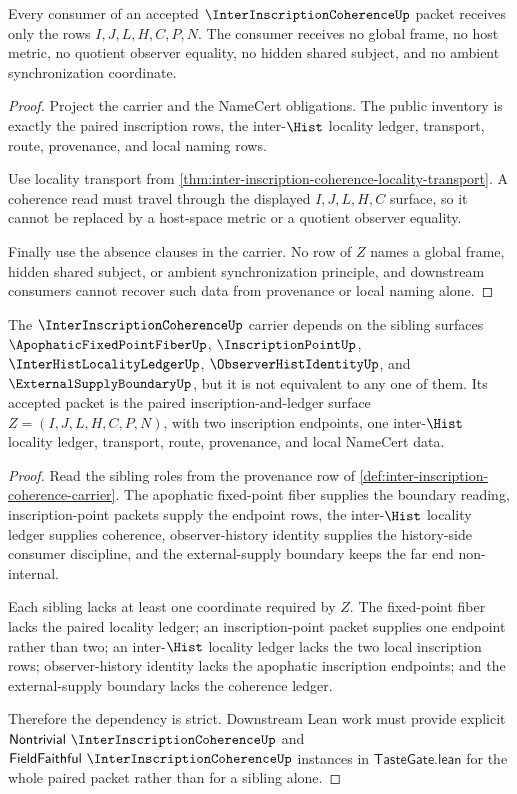 \begin{theorem}
\label{thm:inter-inscription-coherence-ledger-nonescape}
Every consumer of an accepted $\InterInscriptionCoherenceUp$ packet receives only the rows $I,J,L,H,C,P,N$. The consumer receives no global frame, no host metric, no quotient observer equality, no hidden shared subject, and no ambient synchronization coordinate.
\end{theorem}
\begin{proof}
Project the carrier and the NameCert obligations. The public inventory is exactly the paired inscription rows, the inter-$\Hist$ locality ledger, transport, route, provenance, and local naming rows.

Use locality transport from \autoref{thm:inter-inscription-coherence-locality-transport}. A coherence read must travel through the displayed $I,J,L,H,C$ surface, so it cannot be replaced by a host-space metric or a quotient observer equality.

Finally use the absence clauses in the carrier. No row of $Z$ names a global frame, hidden shared subject, or ambient synchronization principle, and downstream consumers cannot recover such data from provenance or local naming alone.
\end{proof}

\begin{theorem}
\label{thm:inter-inscription-coherence-sibling-dependency}
The $\InterInscriptionCoherenceUp$ carrier depends on the sibling surfaces $\ApophaticFixedPointFiberUp$, $\InscriptionPointUp$, $\InterHistLocalityLedgerUp$, $\ObserverHistIdentityUp$, and $\ExternalSupplyBoundaryUp$, but it is not equivalent to any one of them. Its accepted packet is the paired inscription-and-ledger surface $Z=(I,J,L,H,C,P,N)$, with two inscription endpoints, one inter-$\Hist$ locality ledger, transport, route, provenance, and local NameCert data.
\end{theorem}
\begin{proof}
Read the sibling roles from the provenance row of \autoref{def:inter-inscription-coherence-carrier}. The apophatic fixed-point fiber supplies the boundary reading, inscription-point packets supply the endpoint rows, the inter-$\Hist$ locality ledger supplies coherence, observer-history identity supplies the history-side consumer discipline, and the external-supply boundary keeps the far end non-internal.

Each sibling lacks at least one coordinate required by $Z$. The fixed-point fiber lacks the paired locality ledger; an inscription-point packet supplies one endpoint rather than two; an inter-$\Hist$ locality ledger lacks the two local inscription rows; observer-history identity lacks the apophatic inscription endpoints; and the external-supply boundary lacks the coherence ledger.

Therefore the dependency is strict. Downstream Lean work must provide explicit $\mathsf{Nontrivial}\ \InterInscriptionCoherenceUp$ and $\mathsf{FieldFaithful}\ \InterInscriptionCoherenceUp$ instances in $\mathsf{TasteGate.lean}$ for the whole paired packet rather than for a sibling alone.
\end{proof}


